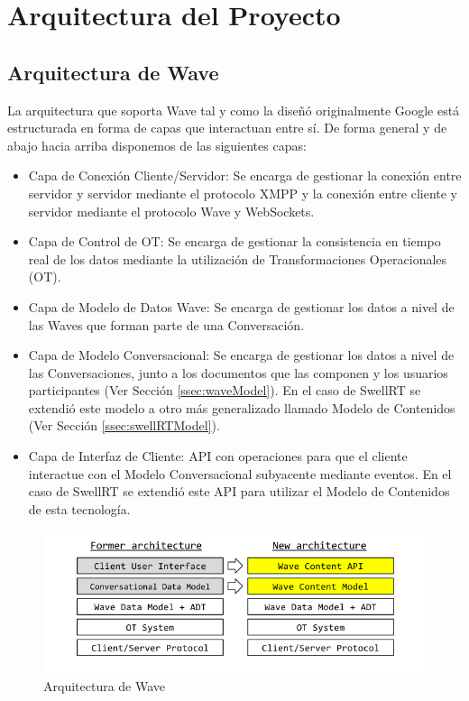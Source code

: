 \newpage
\thispagestyle{sectioned}
\chapter{Arquitectura del Proyecto}

\section{Arquitectura de Wave}

	La arquitectura que soporta Wave tal y como la diseñó originalmente Google está estructurada en forma de capas que interactuan entre sí. De forma general y de abajo hacia arriba disponemos de las siguientes capas:
	
	\begin{itemize}
		\item Capa de Conexión Cliente/Servidor: Se encarga de gestionar la conexión entre servidor y servidor mediante el protocolo XMPP y la conexión entre cliente y servidor mediante el protocolo Wave y WebSockets.
		\item Capa de Control de OT: Se encarga de gestionar la consistencia en tiempo real de los datos mediante la utilización de Transformaciones Operacionales (OT).
		\item Capa de Modelo de Datos Wave: Se encarga de gestionar los datos a nivel de las Waves que forman parte de una Conversación.
		\item Capa de Modelo Conversacional: Se encarga de gestionar los datos a nivel de las Conversaciones, junto a los documentos que las componen y los usuarios participantes (Ver Sección \ref{ssec:waveModel}). En el caso de SwellRT se extendió este modelo a otro más generalizado llamado Modelo de Contenidos (Ver Sección \ref{ssec:swellRTModel}).
		\item Capa de Interfaz de Cliente: API con operaciones para que el cliente interactue con el Modelo Conversacional subyacente mediante eventos. En el caso de SwellRT se extendió este API para utilizar el Modelo de Contenidos de esta tecnología. 
	\end{itemize}
	
	\begin{figure}[H]
	  \centering
	    \includegraphics[keepaspectratio, scale=0.6]{Media/Captures/waveArch.png}
	  \caption{Arquitectura de Wave}
	  \label{fig:waveArch}
	\end{figure}
	

